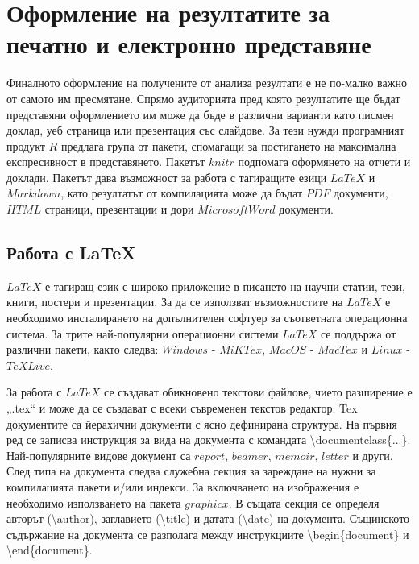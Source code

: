 \newpage
\chapter{Оформление на резултатите за печатно и електронно представяне}
\label{chapter11}
\thispagestyle{empty}

Финалното оформление на получените от анализа резултати е не по-малко важно от самото им пресмятане. Спрямо аудиторията пред която резултатите ще бъдат представяни оформлението им може да бъде в различни варианти като писмен доклад, уеб страница или презентация със слайдове. За тези нужди програмният продукт $R$ предлага група от пакети, спомагащи за постигането на максимална експресивност в представянето. Пакетът $knitr$ подпомага оформянето на отчети и доклади. Пакетът дава възможност за работа с тагиращите езици $LaTeX$ и $Markdown$, като резултатът от компилацията може да бъдат $PDF$ документи, $HTML$ страници, презентации и дори $Microsoft Word$ документи. 

\section{Работа с LaTeX}

$LaTeX$ е тагиращ език с широко приложение в писането на научни статии, тези, книги, постери и презентации. За да се използват възможностите на $LaTeX$ е необходимо инсталирането на допълнителен софтуер за съответната операционна система. За трите най-популярни операционни системи $LaTeX$ се поддържа от различни пакети, както следва: $Windows$ - $MiKTex$, $MacOS$ - $MacTex$ и $Linux$ - $TeX Live$.

За работа с $LaTeX$ се създават обикновено текстови файлове, чието разширение е „.tex“ и може да се създават с всеки съвременен текстов редактор. Tex документите са йерахични документи с ясно дефинирана структура. На първия ред се записва инструкция за вида на документа с командата \textbackslash documentclass\{...\}. Най-популярните видове документ са $report$, $beamer$, $memoir$, $letter$ и други. След типа на документа следва служебна секция за зареждане на нужни за компилацията пакети и/или индекси. За включването на изображения е необходимо използването на пакета $graphicx$. В същата секция се определя авторът (\textbackslash author), заглавието (\textbackslash title) и датата (\textbackslash date) на документа. Същинското съдържание на документа се разполага между инструкциите \textbackslash begin\{document\} и \textbackslash end\{document\}.

